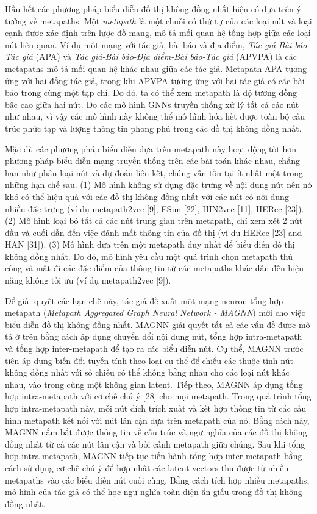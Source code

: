  Hầu hết các phương pháp biểu diễn đồ thị không đồng nhất hiện có dựa trên ý tưởng về metapaths. Một \textit{metapath} là một chuỗi có thứ tự của các loại nút và loại cạnh được xác định trên lược đồ mạng, mô tả mối quan hệ tổng hợp giữa các loại nút liên quan. Ví dụ một mạng với tác giả, bài báo và địa điểm, \textit{Tác giả-Bài báo-Tác giả} (APA) và \textit{Tác giả-Bài báo-Địa điểm-Bài báo-Tác giả} (APVPA) là các metapaths mô tả mối quan hệ khác nhau giữa các tác giả. Metapath APA tương ứng với hai đồng tác giả, trong khi APVPA tương ứng với hai tác giả có các bài báo trong cùng một tạp chí. Do đó, ta có thể xem metapath là độ tương đồng bậc cao giữa hai nút. Do các mô hình GNNs truyền thống xử lý tất cả các nút như nhau, vì vậy các mô hình này không thể mô hình hóa hết được toàn bộ cấu trúc phức tạp và lượng thông tin phong phú trong các đồ thị không đồng nhất.

 Mặc dù các phương pháp biểu diễn dựa trên metapath này hoạt động tốt hơn phương pháp biểu diễn mạng truyền thống trên các bài toán khác nhau, chẳng hạn như phân loại nút và dự đoán liên kết, chúng vẫn tồn tại ít nhất một trong những hạn chế sau. (1) Mô hình không sử dụng đặc trưng về nội dung nút nên nó khó có thể hiệu quả với các đồ thị không đồng nhất với các nút có nội dung nhiều đặc trưng (ví dụ metapath2vec [9], ESim [22], HIN2vec [11], HERec [23]). (2) Mô hình loại bỏ tất cả các nút trung gian trên metapath, chỉ xem xét 2 nút đầu và cuối dẫn đến việc đánh mất thông tin của đồ thị (ví dụ HERec [23] and HAN [31]). (3) Mô hình dựa trên một metapath duy nhất để biểu diễn đồ thị không đồng nhất. Do đó, mô hình yêu cầu một quá trình chọn metapath thủ công và mất đi các đặc điểm của thông tin từ các metapaths khác dẫn đến hiệu năng không tối ưu (ví dụ metapath2vec [9]). 

 Để giải quyết các hạn chế này, tác giả đề xuất một mạng neuron tổng hợp metapath (\textit{Metapath Aggregated Graph Neural Network - MAGNN}) mới cho việc biểu diễn đồ thị không đồng nhất. MAGNN giải quyết tất cả các vấn đề được mô tả ở trên bằng cách áp dụng chuyển đổi nội dung nút, tổng hợp intra-metapath và tổng hợp inter-metapath để tạo ra các biểu diễn nút. Cụ thể, MAGNN trước tiên áp dụng biến đổi tuyến tính theo loại cụ thể để chiếu các thuộc tính nút không đồng nhất với số chiều có thể không bằng nhau cho các loại nút khác nhau, vào trong cùng một không gian latent. Tiếp theo, MAGNN áp dụng tổng hợp intra-metapath với cơ chế chú ý [28] cho mọi metapath. Trong quá trình tổng hợp intra-metapath này, mỗi nút đích trích xuất và kết hợp thông tin từ các cấu hình metapath kết nối với nút lân cận dựa trên metapath của nó. Bằng cách này, MAGNN nắm bắt được thông tin về cấu trúc và ngữ nghĩa của các đồ thị không đồng nhất từ cả các nút lân cận và bối cảnh metapath giữa chúng. Sau khi tổng hợp intra-metapath, MAGNN tiếp tục tiến hành tổng hợp inter-metapath bằng cách sử dụng cơ chế chú ý để hợp nhất các latent vectors thu được từ nhiều metapaths vào các biểu diễn nút cuối cùng. Bằng cách tích hợp nhiều metapaths, mô hình của tác giả có thể học ngữ nghĩa toàn diện ẩn giấu trong đồ thị không đồng nhất. 

